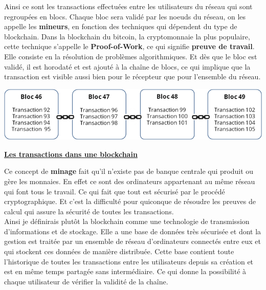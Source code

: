 \documentclass[12pt]{report}
\begin{document}
\hspace{1cm} Ainsi ce sont les transactions effectuées entre les utilisateurs du réseau qui sont regroupées en blocs. Chaque bloc sera validé par les noeuds du réseau, on les appelle les \textbf{mineurs},  en fonction des techniques qui dépendent du type de blockchain. Dans la blockchain du bitcoin, la cryptomonnaie la plus populaire, cette technique s'appelle le \textbf{Proof-of-Work}, ce qui signifie \textbf{preuve de travail}. Elle consiste en la résolution de problèmes algorithmiques. Et dès que le bloc est validé, il est horodaté et est ajouté à la chaîne de blocs, ce qui implique que la transaction est visible aussi bien pour le récepteur que pour l'ensemble du réseau.

\begin{center}
    \includegraphics[width=1\textwidth]{block_schema}

    \textbf{\underline{Les transactions dans une blockchain}} \\[1cm]
\end{center}

\hspace{1cm} Ce concept de \textbf{minage} fait qu'il n'existe pas de banque centrale qui produit ou gère les monnaies. En effet ce sont des ordinateurs appartenant au même réseau qui font tous le travail. Ce qui fait que tout est sécurisé par le procédé cryptographique. Et c'est la difficulté pour quiconque de résoudre les preuves de calcul qui assure la sécurité de toutes les transactions.\\

\hspace{1cm} Ainsi je définirais plutôt la blockchain comme une technologie de transmission d'informations et de stockage. Elle a une base de données très sécurisée et dont la gestion est traitée par un ensemble de réseau d'ordinateurs connectés entre eux et qui stockent ces données de manière distribuée. Cette base contient toute l'historique de toutes les transactions entre les utilisateurs depuis sa création et est en même temps partagée sans intermédiaire. Ce qui donne la possibilité à chaque utilisateur de vérifier la validité de la chaîne.
\end{document}
